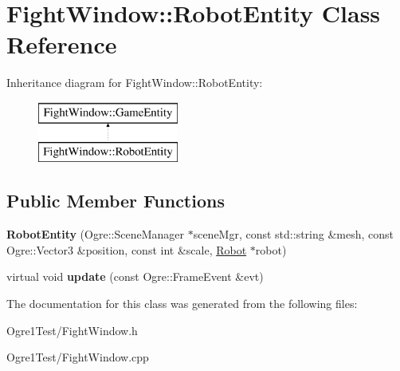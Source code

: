 \hypertarget{class_fight_window_1_1_robot_entity}{}\section{Fight\+Window\+:\+:Robot\+Entity Class Reference}
\label{class_fight_window_1_1_robot_entity}
Inheritance diagram for Fight\+Window\+:\+:Robot\+Entity\+:\begin{figure}[H]
\begin{center}
\leavevmode
\includegraphics[height=2.000000cm]{class_fight_window_1_1_robot_entity}
\end{center}
\end{figure}
\subsection*{Public Member Functions}
\begin{DoxyCompactItemize}
\item 
{\bfseries Robot\+Entity} (Ogre\+::\+Scene\+Manager $\ast$scene\+Mgr, const std\+::string \&mesh, const Ogre\+::\+Vector3 \&position, const int \&scale, \hyperlink{class_robot}{Robot} $\ast$robot)\hypertarget{class_fight_window_1_1_robot_entity_ac15efdebc43cccf3f7ca70faec49bb84}{}\label{class_fight_window_1_1_robot_entity_ac15efdebc43cccf3f7ca70faec49bb84}

\item 
virtual void {\bfseries update} (const Ogre\+::\+Frame\+Event \&evt)\hypertarget{class_fight_window_1_1_robot_entity_acb28a80dbf8e5771b77c24aaf59ea897}{}\label{class_fight_window_1_1_robot_entity_acb28a80dbf8e5771b77c24aaf59ea897}

\end{DoxyCompactItemize}


The documentation for this class was generated from the following files\+:\begin{DoxyCompactItemize}
\item 
Ogre1\+Test/Fight\+Window.\+h\item 
Ogre1\+Test/Fight\+Window.\+cpp\end{DoxyCompactItemize}

